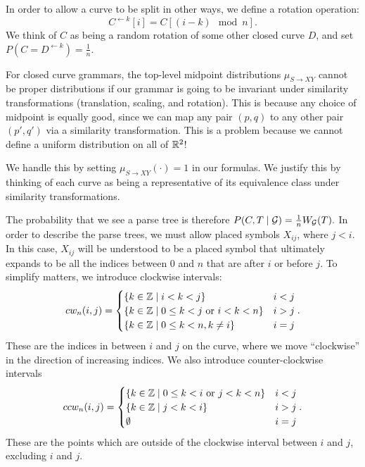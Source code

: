 \documentclass{article}
\begin{document}
In order to allow a curve to be split in other ways, we define a
rotation operation:
$$C^{\leftarrow k}[i] = C[(i-k) \mod n].$$
We think of $C$ as being a random rotation of some other closed
curve $D$, and set $P(C = D^{\leftarrow k}) = \frac{1}{n}$.


\begin{rmk}
  For closed curve grammars, the top-level midpoint distributions
  $\mu_{S\to XY}$ cannot be proper distributions if our grammar is
  going to be invariant under similarity transformations (translation,
  scaling, and rotation). This is because any choice of midpoint is
  equally good, since we can map any pair $(p,q)$ to any other pair
  $(p',q')$ via a similarity transformation. This is a problem
  because we cannot define a uniform distribution on all of $\mathbb{R}^2$!

  We handle this by setting $\mu_{S\to XY}(\cdot) = 1$ in our
  formulas. We justify this by thinking of each curve as being a
  representative of its equivalence class under similarity
  transformations.  
\end{rmk}

The probability that we see a parse tree is therefore $P(C,T\mid {\mathcal G})
= \frac{1}{n} W_{{\mathcal G}}(T).$ In order to describe the parse trees, we
must allow placed symbols $X_{ij}$, where $j<i$. In this case,
$X_{ij}$ will be understood to be a placed symbol that ultimately
expands to be all the indices between $0$ and $n$ that are after $i$
or before $j$. To simplify matters, we introduce clockwise intervals:
$$cw_n(i,j) = 
\begin{cases}
\{k \in {\mathbb Z} \mid i < k < j\} & i < j \\
\{k \in {\mathbb Z} \mid 0 \le k < j \mbox{ or } i < k < n \} & i > j \\
\{k \in {\mathbb Z} \mid 0\le k < n, k\ne i \} & i = j\\
\end{cases}.$$
These are the indices in between $i$ and $j$ on the curve, where we
move ``clockwise'' in the direction of increasing indices.  We also
introduce counter-clockwise intervals
$$ccw_n(i,j) = 
\begin{cases}
\{k \in {\mathbb Z} \mid 0 \le k < i \mbox{ or } j < k < n \} & i < j \\
\{k \in {\mathbb Z} \mid j < k < i\} & i > j \\
\emptyset & i = j\\
\end{cases}.$$
These are the points which are outside of the clockwise interval
between $i$ and $j$, excluding $i$ and $j$.
\end{document}
